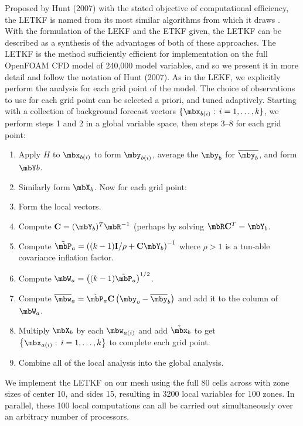 Proposed by Hunt \etal (2007) with the stated objective of computational efficiency, the LETKF is named from its most similar algorithms from which it draws \cite{hunt2007efficient}.
With the formulation of the LEKF and the ETKF given, the LETKF can be  described as a synthesis of the advantages of both of these approaches.
The LETKF is the method sufficiently efficient for implementation on the full OpenFOAM CFD model of 240,000 model variables, and so we present it in more detail and follow the notation of Hunt \etal (2007). 
As in the LEKF, we explicitly perform the analysis for each grid point of the model.
The choice of observations to use for each grid point can be selected a priori, and tuned adaptively.
Starting with a collection of background forecast vectors $\{ \mbx_{b(i)}:\,i=1,\ldots,k \}$, we perform steps 1 and 2 in a global variable space, then steps 3--8 for each grid point:
\begin{enumerate}
\item Apply $H$ to $\mbx_{b(i)}$ to form $\mby_{b(i)}$, average the $\mby_b$ for $\overline{\mby_b}$, and form $\mbY b$.
\item Similarly form $\mbX_b$. Now for each grid point:
\item Form the local vectors.
\item Compute $\mathbf{C}=(\mbY_b)^T\mbR^{-1}$ (perhaps by solving $\mbR \mathbf{C}^T = \mbY_b$.
\item Compute $\tilde{\mbP}_a = \left( (k-1)\mathbf{I} / \rho + \mathbf{C} \mbY _b \right ) ^{-1}$ where $\rho > 1$ is a tun-able covariance inflation factor.
\item Compute $\mbW_a = \left ( (k-1) \tilde{\mbP} _a \right ) ^{1/2}$.
\item Compute $\overline{\mbw} _a  = \tilde{\mbP}_a \mathbf{C} \left ( \mby_o - \overline{\mby} _b \right )$ and add it to the column of $\mbW_a$.
\item Multiply $\mbX_b$ by each $\mbw_{a(i)}$ and add $\tilde{\mbx}_b$ to get $\left\{ \mbx_{a(i)}:\,i=1,\ldots,k\right \}$ to complete each grid point.
\item Combine all of the local analysis into the global analysis.
\end{enumerate}
We implement the LETKF on our mesh using the full 80 cells across with zone sizes of center 10, and sides 15, resulting in 3200 local variables for 100 zones.
In parallel, these 100 local computations can all be carried out simultaneously over an arbitrary number of processors.

